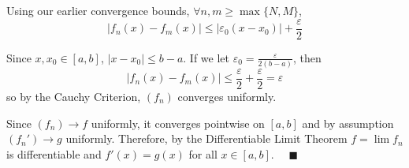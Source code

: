\documentclass[12pt]{article}
\newcommand{\qed}{\quad \blacksquare}
\newcommand{\abs}[1]{\left\vert #1 \right\vert}
\newcommand{\ep}{\varepsilon}
\begin{document}
        Using our earlier convergence bounds, $\forall n, m \geq \max\{N, M\}$,
        \[\abs{f_n(x) - f_m(x)} \leq \abs{\ep_0(x - x_0)} + \frac{\ep}{2}\]

        Since $x, x_0 \in [a, b]$, $\abs{x - x_0} \leq b - a$. If we let $\ep_0 = \frac{\ep}{2(b - a)}$, then
        \[\abs{f_n(x) - f_m(x)} \leq \frac{\ep}{2} + \frac{\ep}{2} = \ep\]
        so by the Cauchy Criterion, $(f_n)$ converges uniformly.

        Since $(f_n) \to f$ uniformly, it converges pointwise on $[a, b]$ and by assumption $(f_n') \to g$ uniformly. Therefore, by the Differentiable Limit Theorem $f = \lim f_n$ is differentiable and $f'(x) = g(x)$ for all $x\in[a,b]$. $\qed$

    \color{black}
\end{document}
